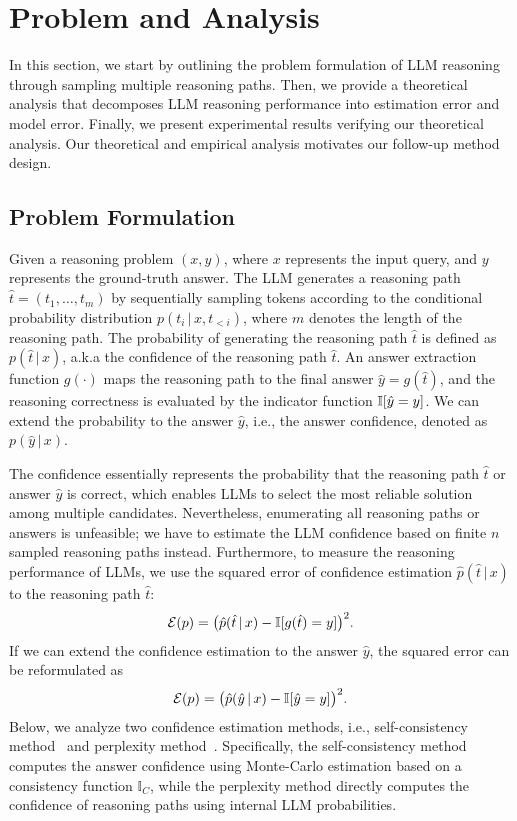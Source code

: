 \section{Problem and Analysis}
\label{sec:problem}

In this section, we start by outlining the problem formulation of LLM reasoning through sampling multiple reasoning paths.
Then, we provide a theoretical analysis that decomposes LLM reasoning performance into estimation error and model error. 
Finally, we present experimental results verifying our theoretical analysis. 
Our theoretical and empirical analysis motivates our follow-up method design. 

\subsection{Problem Formulation}

Given a reasoning problem $(x, y)$, where $x$ represents the input query, and $y$ represents the ground-truth answer. 
The LLM generates a reasoning path $\hat{t} = (t_1, \ldots, t_m)$ by sequentially sampling tokens according to the conditional probability distribution $p(t_i \,|\, x, t_{<i})$, where $m$ denotes the length of the reasoning path. 
The probability of generating the reasoning path $\hat{t}$ is defined as $p(\hat{t} \,|\, x)$, a.k.a the confidence of the reasoning path $\hat{t}$.
An answer extraction function $g(\cdot)$ maps the reasoning path to the final answer $\hat{y} = g(\hat{t})$, and the reasoning correctness is evaluated by the indicator function $\mathbb{I}[\hat{y} = y]$. 
We can extend the probability to the answer $\hat{y}$, i.e., the answer confidence, denoted as $p(\hat{y} \,|\, x)$.

The confidence essentially represents the probability that the reasoning path $\hat{t}$ or answer $\hat{y}$ is correct, which enables LLMs to select the most reliable solution among multiple candidates.
Nevertheless, enumerating all reasoning paths or answers is unfeasible; 
we have to estimate the LLM confidence based on finite $n$ sampled reasoning paths instead. 
Furthermore, 
to measure the reasoning performance of LLMs, we use the squared error of confidence estimation $\hat{p}(\hat{t}\,|\,x)$ to the reasoning path $\hat{t}$:
\begin{equation*}
\mathcal{E}(p) = \big(\hat{p}(\hat{t} \,|\, x) - \mathbb{I}[g(\hat{t}) = y] \big)^2.
\end{equation*}
If we can extend the confidence estimation to the answer $\hat{y}$, the squared error can be reformulated as
\begin{equation*}
\mathcal{E}(p) = \big(\hat{p}(\hat{y} \,|\, x) - \mathbb{I}[\hat{y} = y] \big)^2.
\end{equation*}
Below, we analyze two confidence estimation methods, i.e., self-consistency method~\citep{wang2022self} and perplexity method~\cite{huang2023look}. Specifically, the self-consistency method computes the answer confidence using Monte-Carlo estimation based on a consistency function $\mathbb{I}_C$, while the perplexity method directly computes the confidence of reasoning paths using internal LLM probabilities. 

